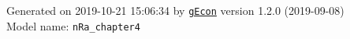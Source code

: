 \documentclass[10pt,a4paper]{article}
\numberwithin{equation}{section}
\begin{document}
\begin{flushleft}{\large
Generated  on 2019-10-21 15:06:34 by \href{http://gecon.r-forge.r-project.org/}{\texttt{gEcon}} version 1.2.0 (2019-09-08)\\
Model name: \verb+nRa_chapter4+
}\end{flushleft}



\end{document}
